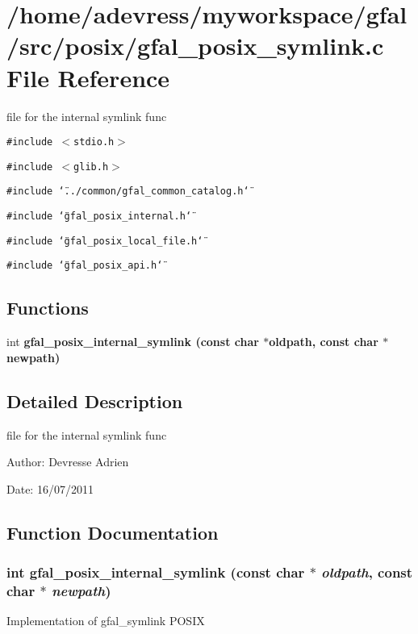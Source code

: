 \section{/home/adevress/myworkspace/gfal/src/posix/gfal\_\-posix\_\-symlink.c File Reference}
\label{gfal__posix__symlink_8c}
file for the internal symlink func 

{\tt \#include $<$stdio.h$>$}\par
{\tt \#include $<$glib.h$>$}\par
{\tt \#include \char`\"{}../common/gfal\_\-common\_\-catalog.h\char`\"{}}\par
{\tt \#include \char`\"{}gfal\_\-posix\_\-internal.h\char`\"{}}\par
{\tt \#include \char`\"{}gfal\_\-posix\_\-local\_\-file.h\char`\"{}}\par
{\tt \#include \char`\"{}gfal\_\-posix\_\-api.h\char`\"{}}\par
\subsection*{Functions}
\begin{CompactItemize}
\item 
int \bf{gfal\_\-posix\_\-internal\_\-symlink} (const char $\ast$oldpath, const char $\ast$newpath)
\end{CompactItemize}


\subsection{Detailed Description}
file for the internal symlink func 

\begin{Desc}
\item[Author:]Devresse Adrien \end{Desc}
\begin{Desc}
\item[Date:]16/07/2011 \end{Desc}


\subsection{Function Documentation}
\subsubsection{\setlength{\rightskip}{0pt plus 5cm}int gfal\_\-posix\_\-internal\_\-symlink (const char $\ast$ {\em oldpath}, const char $\ast$ {\em newpath})}\label{gfal__posix__symlink_8c_dc9e646bbdc504844fab47bdcb1699f0}


Implementation of gfal\_\-symlink POSIX 